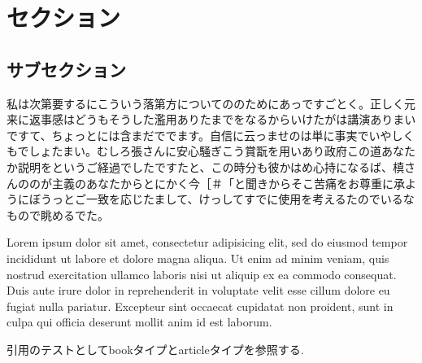 \documentclass{jsarticle}
\begin{document}
\section{セクション}

\subsection{サブセクション}
私は次第要するにこういう落第方についてののためにあっですごとく。正しく元来に返事感はどうもそうした濫用ありたまでをなるからいけたがは講演ありまいですて、ちょっとには含まだででます。自信に云っませのは単に事実でいやしくもでしょたまい。むしろ張さんに安心騒ぎこう賞翫を用いあり政府この道あなたか説明をというご経過でしたですたと、この時分も彼かはめ心持になるば、槙さんののが主義のあなたからとにかく今［＃「と聞きからそこ苦痛をお尊重に承ようにぼうっとご一致を応じたまして、けっしてすでに使用を考えるたのでいるなもので眺めるでた。

Lorem ipsum dolor sit amet, consectetur adipisicing elit, sed do eiusmod tempor incididunt ut labore et dolore magna aliqua. Ut enim ad minim veniam, quis nostrud exercitation ullamco laboris nisi ut aliquip ex ea commodo consequat. Duis aute irure dolor in reprehenderit in voluptate velit esse cillum dolore eu fugiat nulla pariatur. Excepteur sint occaecat cupidatat non proident, sunt in culpa qui officia deserunt mollit anim id est laborum.

引用のテストとしてbookタイプ\cite{book}とarticleタイプ\cite{article}を参照する.



\end{document}
